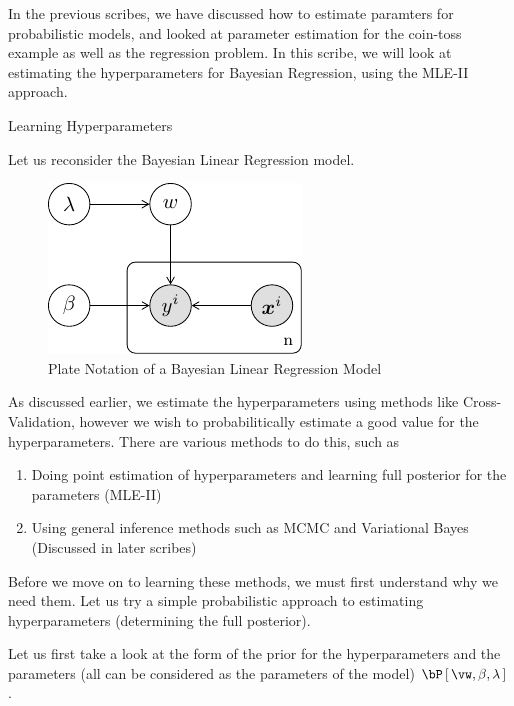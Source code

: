 \documentclass{article}
\begin{document}
\makeheader

In the previous scribes, we have discussed how to estimate paramters for probabilistic models, and looked at parameter estimation for the coin-toss example as well as the regression problem. In this scribe, we will look at estimating the hyperparameters for Bayesian Regression, using the MLE-II approach.

\begin{ssection}[1]{Learning Hyperparameters}

	Let us reconsider the Bayesian Linear Regression model.

	\begin{figure}[h!]
		\centering
		\includegraphics{includes/scribe03/bayesian-regression-model.pdf}
		\caption{Plate Notation of a Bayesian Linear Regression Model}
		\label{fig:bayes-reg-model}
	\end{figure}

	As discussed earlier, we estimate the hyperparameters using methods like Cross-Validation, however we wish to probabilitically estimate a good value for the hyperparameters. There are various methods to do this, such as

	\begin{enumerate}[label=(\roman*)]
		\item Doing point estimation of hyperparameters and learning full posterior for the parameters (MLE-II)
		\item Using general inference methods such as MCMC and Variational Bayes (Discussed in later scribes)
	\end{enumerate}

	Before we move on to learning these methods, we must first understand why we need them. Let us try a simple probabilistic approach to estimating hyperparameters (determining the full posterior). \br

	Let us first take a look at the form of the prior for the hyperparameters and the parameters (all can be considered as the parameters of the model) $\prob{\vw, \beta, \lambda}$. \br


\end{ssection}
\end{document}
